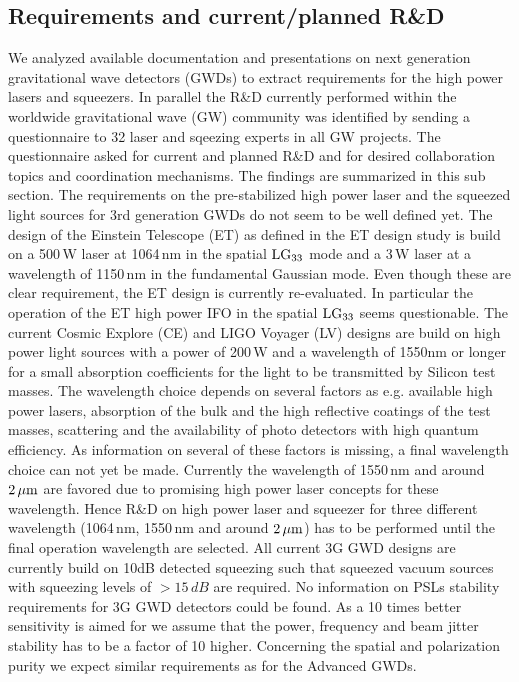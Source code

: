 \subsection{Requirements and current/planned R\&D}
We analyzed available documentation and presentations on next generation gravitational wave detectors (GWDs) to extract requirements for the high power lasers and squeezers. In parallel the  R\&D currently performed within the worldwide gravitational wave (GW) community was identified by sending a questionnaire to 32 laser and sqeezing experts in all GW projects. The questionnaire asked for current and planned R\&D and for desired collaboration topics and coordination mechanisms. The findings are summarized in this sub section.
The requirements on the pre-stabilized high power laser and the squeezed light sources for 3rd generation GWDs do not seem to be well defined yet. The design of the Einstein Telescope (ET) as defined in the ET design study is build on a 500\,W laser at 1064\,nm in the spatial $\rm LG_{33}$ mode and a 3\,W laser at a wavelength of 1150\,nm in the fundamental Gaussian mode. Even though these are clear requirement, the ET design is currently re-evaluated. In particular the operation of the ET high power IFO in the spatial $\rm LG_{33}$ seems questionable. The current Cosmic Explore (CE) and LIGO Voyager (LV) designs are build on high power light sources with a power of 200\,W and a wavelength of 1550nm or longer for a small absorption coefficients for the light to be transmitted by Silicon test masses. The wavelength choice depends on several factors as e.g. available high power lasers, absorption of the bulk and the high reflective coatings of the test masses, scattering and the availability of photo detectors with high quantum efficiency. As information on several of these factors is missing, a final wavelength choice can not yet be made. Currently the wavelength of 1550\,nm and around $\rm 2\, \mu m $ are favored due to promising high power laser concepts for these wavelength. Hence R\&D on high power laser and squeezer for three different wavelength (1064\,nm, 1550\,nm and around $\rm 2\, \mu m $) has to be performed until the final operation wavelength are selected. All current 3G GWD designs are currently build on 10dB detected squeezing such that squeezed vacuum sources with squeezing levels of $> 15\,dB$ are required. No information on PSLs stability requirements for 3G GWD detectors could be found. As a 10 times better sensitivity is aimed for we assume that the power, frequency and beam jitter stability has to be a factor of 10 higher. Concerning the spatial and polarization purity we expect similar requirements as for the Advanced GWDs.
